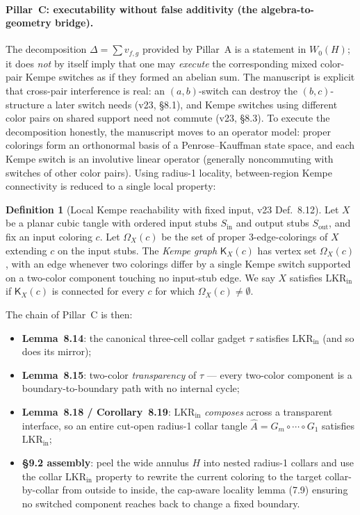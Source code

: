 \documentclass[11pt]{article}
\theoremstyle{definition}
\newtheorem{definition}{Definition}
\newcommand{\Wz}{W_0}
\newcommand{\LKR}{\mathrm{LKR}_{\mathrm{in}}}
\begin{document}
\paragraph{Pillar~C: executability without false additivity (the
algebra-to-geometry bridge).} The decomposition $\Delta=\sum v_{f,g}$ provided
by Pillar~A is a statement in $\Wz(H)$; it does \emph{not} by itself imply that
one may \emph{execute} the corresponding mixed color-pair Kempe switches as if
they formed an abelian sum. The manuscript is explicit that cross-pair
interference is real: an $(a,b)$-switch can destroy the $(b,c)$-structure a
later switch needs (v23, \S8.1), and Kempe switches using different color pairs
on shared support need not commute (v23, \S8.3). To execute the decomposition
honestly, the manuscript moves to an operator model: proper colorings form an
orthonormal basis of a Penrose--Kauffman state space, and each Kempe switch is
an involutive linear operator (generally noncommuting with switches of other
color pairs). Using radius-1 locality, between-region Kempe connectivity is
reduced to a single local property:
\begin{definition}[Local Kempe reachability with fixed input, v23 Def.~8.12]
\label{def:lkr}
Let $X$ be a planar cubic tangle with ordered input stubs $S_{\mathrm{in}}$ and
output stubs $S_{\mathrm{out}}$, and fix an input coloring $c$. Let
$\Omega_X(c)$ be the set of proper 3-edge-colorings of $X$ extending $c$ on the
input stubs. The \emph{Kempe graph} $\mathsf{K}_X(c)$ has vertex set
$\Omega_X(c)$, with an edge whenever two colorings differ by a single Kempe
switch supported on a two-color component touching no input-stub edge. We say
$X$ satisfies $\LKR$ if $\mathsf{K}_X(c)$ is connected for every $c$ for which
$\Omega_X(c)\neq\emptyset$.
\end{definition}

The chain of Pillar~C is then:
\begin{itemize}
  \item \textbf{Lemma~8.14}: the canonical three-cell collar gadget $\tau$
        satisfies $\LKR$ (and so does its mirror);
  \item \textbf{Lemma~8.15}: two-color \emph{transparency} of $\tau$ --- every
        two-color component is a boundary-to-boundary path with no internal
        cycle;
  \item \textbf{Lemma~8.18 / Corollary~8.19}: $\LKR$ \emph{composes} across a
        transparent interface, so an entire cut-open radius-1 collar tangle
        $\widehat{A}=G_m\circ\cdots\circ G_1$ satisfies $\LKR$;
  \item \textbf{\S9.2 assembly}: peel the wide annulus $H$ into nested radius-1
        collars and use the collar $\LKR$ property to rewrite the current
        coloring to the target collar-by-collar from outside to inside, the
        cap-aware locality lemma (7.9) ensuring no switched component reaches
        back to change a fixed boundary.
\end{itemize}
\end{document}

